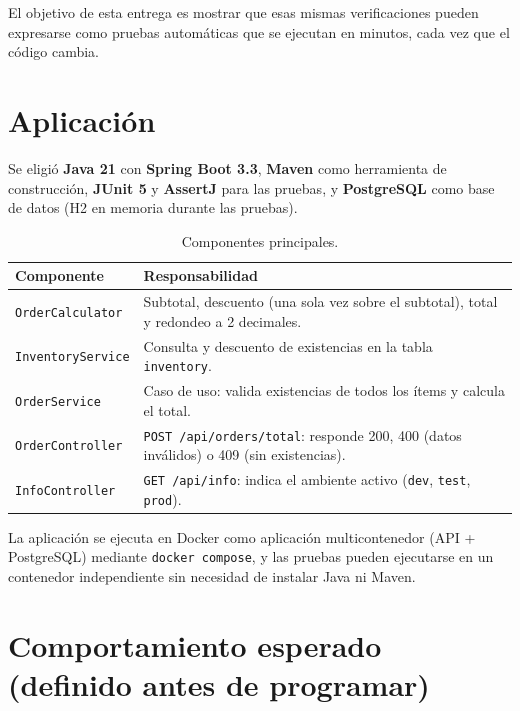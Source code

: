 \documentclass[11pt,a4paper]{article}
\begin{document}
El objetivo de esta entrega es mostrar que esas mismas verificaciones pueden expresarse como pruebas
automáticas que se ejecutan en minutos, cada vez que el código cambia.

\section{Aplicación}
\label{sec:app}

Se eligió \textbf{Java 21} con \textbf{Spring Boot 3.3}, \textbf{Maven} como herramienta de
construcción, \textbf{JUnit 5} y \textbf{AssertJ} para las pruebas, y \textbf{PostgreSQL} como base
de datos (H2 en memoria durante las pruebas).

\begin{table}[H]
\centering
\begin{tabularx}{\textwidth}{@{}l L@{}}
\toprule
\textbf{Componente} & \textbf{Responsabilidad}\\
\midrule
\texttt{OrderCalculator} & Subtotal, descuento (una sola vez sobre el subtotal), total y redondeo a 2 decimales.\\
\texttt{InventoryService} & Consulta y descuento de existencias en la tabla \texttt{inventory}.\\
\texttt{OrderService} & Caso de uso: valida existencias de todos los ítems y calcula el total.\\
\texttt{OrderController} & \texttt{POST /api/orders/total}: responde 200, 400 (datos inválidos) o 409 (sin existencias).\\
\texttt{InfoController} & \texttt{GET /api/info}: indica el ambiente activo (\texttt{dev}, \texttt{test}, \texttt{prod}).\\
\bottomrule
\end{tabularx}
\caption{Componentes principales.}
\label{tab:componentes}
\end{table}

La aplicación se ejecuta en Docker como aplicación multicontenedor (API + PostgreSQL) mediante
\texttt{docker compose}, y las pruebas pueden ejecutarse en un contenedor independiente sin necesidad
de instalar Java ni Maven.

\section{Comportamiento esperado (definido antes de programar)}
\label{sec:spec}
\end{document}
